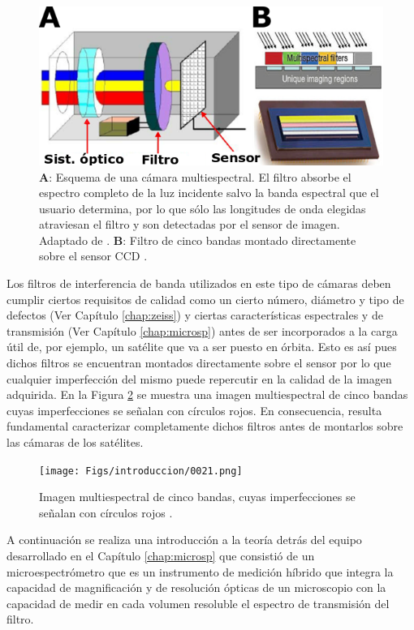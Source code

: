 \begin{figure}[H]
\centering
\includegraphics[width=1.0\textwidth]{Figs/introduccion/camsensor.png}
\caption{\textbf{A}: Esquema de una cámara multiespectral. El filtro absorbe el espectro completo de la luz incidente salvo la banda espectral que el usuario determina, por lo que sólo las longitudes de onda elegidas atraviesan el filtro y son detectadas por el sensor de imagen. Adaptado de \cite{Martinez2008}. \textbf{B}: Filtro de cinco bandas montado directamente sobre el sensor CCD \cite{sensarrib}.}
\label{fig:esquemcamypegfilt}
\end{figure}

 Los filtros de interferencia de banda 
utilizados en este tipo de cámaras deben cumplir ciertos requisitos de calidad como un cierto número, diámetro y tipo de defectos (Ver Capítulo \ref{chap:zeiss}) y ciertas características espectrales y de transmisión (Ver Capítulo \ref{chap:microsp}) antes de ser 
incorporados a la carga útil de, por ejemplo, un satélite que va a ser puesto 
en 
órbita. Esto es así pues dichos filtros se encuentran montados directamente sobre el sensor por lo que cualquier imperfección del mismo puede repercutir en la calidad de la imagen adquirida. En la Figura \ref{fig:speus} se muestra una imagen multiespectral de cinco bandas cuyas imperfecciones se señalan con círculos rojos. En consecuencia, resulta fundamental caracterizar completamente dichos filtros antes de montarlos sobre las cámaras de los satélites.

\begin{figure}[H]
	\centering
	\texttt{[image: Figs/introduccion/0021.png]}
	\caption{Imagen multiespectral de cinco bandas, cuyas imperfecciones se señalan con círculos rojos .}
	\label{fig:speus}
\end{figure}

A continuación se realiza una introducción a la teoría detrás del equipo desarrollado en el Capítulo \ref{chap:microsp} que consistió de un microespectrómetro que es un instrumento de medición híbrido que integra la capacidad de magnificación y de resolución ópticas de un microscopio con la capacidad de medir en cada volumen resoluble el espectro de transmisión del filtro.

